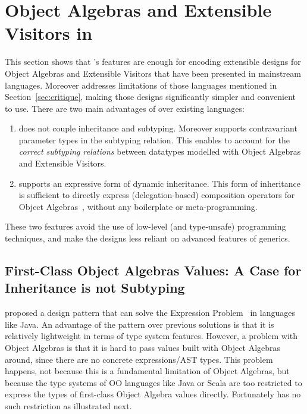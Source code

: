 \section{Object Algebras and Extensible Visitors in \name}
\label{sec:OA}

This section shows that \name's features are enough for encoding extensible
designs for Object Algebras and Extensible Visitors that have been presented in
mainstream languages. Moreover \name addresses limitations of those languages
mentioned in Section~\ref{sec:critique}, making those designs significantly
simpler and convenient to use. There are two main advantages of \name over
existing languages:
\begin{enumerate}
\item \name does not couple inheritance and subtyping. Moreover
\name supports contravariant parameter types in the subtyping
relation. This enables \name to account for the \emph{correct
subtyping relations} between datatypes modelled with Object Algebras
and Extensible Visitors.
\item \name supports an expressive form of dynamic inheritance. This form
  of inheritance is sufficient to directly express (delegation-based) composition
  operators for Object Algebras~\cite{oliveira2012extensibility}, without any boilerplate or meta-programming.
\end{enumerate}

These two features avoid the use of low-level (and type-unsafe) programming
techniques, and make the designs less reliant on advanced
features of generics.


\subsection{First-Class Object Algebras Values: A Case for Inheritance
is not Subtyping}
\label{sec:objectalgebra}

\citet{oliveira2012extensibility} proposed a design pattern that can solve the
Expression Problem~\cite{wadler1998expression} in languages like Java. An
advantage of the pattern over previous solutions is that it is relatively
lightweight in terms of type system features. However, a problem with Object
Algebras is that it is hard to pass values built with Object Algebras around,
since there are no concrete expressions/AST types. This problem happens, not
because this is a fundamental limitation of Object Algebras, but because the
type systems of OO languages like Java or Scala are too restricted to express
the types of first-class Object Algebra values directly. Fortunately \name has no
such restriction as illustrated next.

